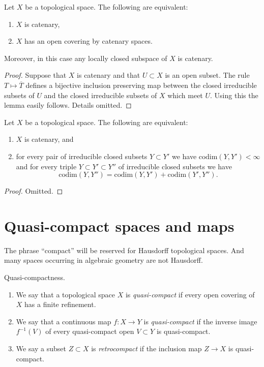 \begin{lemma}
\label{lemma-catenary}
Let $X$ be a topological space.
The following are equivalent:
\begin{enumerate}
\item $X$ is catenary,
\item $X$ has an open covering by catenary spaces.
\end{enumerate}
Moreover, in this case any locally closed subspace of $X$ is catenary.
\end{lemma}

\begin{proof}
Suppose that $X$ is catenary and that $U \subset X$ is an open
subset. The rule $T \mapsto \overline{T}$ defines a bijective
inclusion preserving map between the closed irreducible subsets
of $U$ and the closed irreducible subsets of $X$ which meet $U$.
Using this the lemma easily follows. Details omitted.
\end{proof}

\begin{lemma}
\label{lemma-catenary-in-codimension}
Let $X$ be a topological space. The following are equivalent:
\begin{enumerate}
\item $X$ is catenary, and
\item for every pair of irreducible closed subsets $Y \subset Y'$ we have
$\text{codim}(Y, Y') < \infty$ and for every triple
$Y \subset Y' \subset Y''$ of irreducible closed subsets we have
$$
\text{codim}(Y, Y'') = \text{codim}(Y, Y') + \text{codim}(Y', Y'').
$$
\end{enumerate}
\end{lemma}

\begin{proof}
Omitted.
\end{proof}







\section{Quasi-compact spaces and maps}
\label{section-quasi-compact}

\noindent
The phrase ``compact'' will be reserved
for Hausdorff topological spaces. And many spaces occurring
in algebraic geometry are not Hausdorff.

\begin{definition}
\label{definition-quasi-compact}
Quasi-compactness.
\begin{enumerate}
\item We say that a topological space $X$ is {\it quasi-compact}
if every open covering of $X$ has a finite refinement.
\item We say that a continuous map $f : X \to Y$ is {\it quasi-compact}
if the inverse image $f^{-1}(V)$ of every quasi-compact open $V \subset Y$
is quasi-compact.
\item We say a subset $Z \subset X$ is {\it retrocompact}
if the inclusion map $Z \to X$ is quasi-compact.
\end{enumerate}
\end{definition}

